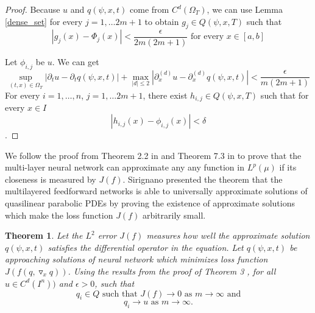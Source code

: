 \documentclass{article}
\newtheorem{theorem}{Theorem}[section]
\begin{document}
\begin{proof}
Because $u$ and $q(\psi,x,t)$ come from $C^{d}(\Omega_{T})$, 
we can use Lemma \ref{dense_set} for every $j = 1, \dots 2m+1$ to obtain $g_{j} \in Q(\psi,x,T)$ such that
\begin{equation}
\left|g_{j}(x)-\Phi_{j}(x)\right|<\frac{\epsilon}{2m(2m+1)} \text{ for every } x \in [a,b]
\end{equation}

	 Let $\phi_{i,j}$ be $u$. We can get
		\begin{equation}
	\sup_{(t,x) \in \Omega_{T}} \left|\partial_{t} u- \partial_{t} q(\psi,x,t)\right| + \max_{|d| \leq 2} \left|\partial_{x}^{(d)} u- \partial_{x}^{(d)} q(\psi,x,t)\right| < \frac{\epsilon}{m(2m+1)}
	\end{equation}
	For every $i=1,\dots,n$, $j=1, \dots 2m+1$, there exist $h_{i,j} \in Q(\psi,x,T)$ such that for every $x \in \textit{I}$
	\[\left|h_{i,j}(x)-\phi_{i,j}(x)\right|<\delta \].



\end{proof}

We follow the proof from Theorem 2.2 in \cite{kurkova} and Theorem 7.3 in \cite{sirignano} to prove that the multi-layer neural network can approximate any any function in $L^{p}(\mu)$ if its closeness is measured by $J(f)$. 
Sirignano \cite{sirignano} presented the theorem that the multilayered feedforward networks is able to universally approximate solutions of quasilinear parabolic PDEs by proving the existence of approximate solutions which make the loss function $J(f)$ arbitrarily small.
\begin{theorem}
	Let the $L^{2}$ error $J(f)$ measures how well the approximate solution $q(\psi,x,t)$ satisfies the differential operator in the equation.  
	Let $q(\psi,x,t)$ be approaching solutions of  neural network which minimizes loss function $J(f(q,\triangledown_{x} q))$. 
	Using the results from the proof of Theorem 3 \cite{hornik}, for all $u \in C^{d}(I^{n}))$ and $\epsilon > 0$, such that
	\[q_i \in \textit{Q} \textrm{ such that } J(f) \rightarrow 0 \textrm{ as } m \rightarrow \infty \text{ and}\]
	\[ q_{i} \rightarrow u  \text{ as } m \rightarrow \infty.\] 
\end{theorem}
\end{document}
